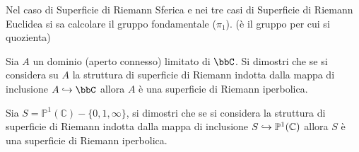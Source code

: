
\begin{osservazione}
Nel caso di Superficie di Riemann Sferica e nei tre casi di Superficie di Riemann Euclidea si sa calcolare il gruppo fondamentale ($\pi_1$). (è il gruppo per cui si quozienta)
\end{osservazione}

\begin{esercizio}
Sia $A$ un dominio (aperto connesso) limitato di $\bbC$. Si dimostri che se si considera su $A$ la struttura di superficie di Riemann indotta dalla mappa di inclusione $A\hrar\bbC$ allora $A$ è una superficie di Riemann iperbolica.
\end{esercizio}



\begin{esercizio}Sia $S=\mathbb{P}^1(\mathbb{C})\minus\{0,1,\infty\}$, si dimostri che se si considera la struttura di superficie di Riemann indotta dalla mappa di inclusione $S\hookrightarrow\mathbb{P}^1(\mathbb{C})$ allora $S$ è una superficie di Riemann iperbolica.
\end{esercizio}


